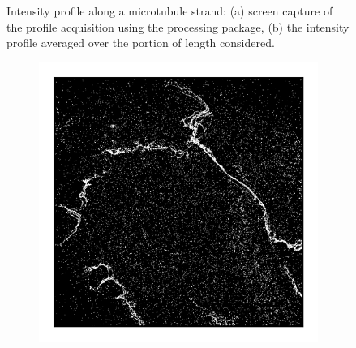 \begin{figure}[htbp]
\begin{subfigure}[b]{0.49\textwidth}
        \caption{}
        \label{fig:microtubules_width_analysis}
    \end{subfigure}
    \label{fig:microtubules_width}
    \caption{Intensity profile along a microtubule strand: (a) screen capture of the profile acquisition using the  processing package, (b) the intensity profile averaged over the portion of length considered.}
\end{figure}

\begin{figure}
    \begin{subfigure}{0.32\textwidth}
        \includegraphics[width=\textwidth]{figures/microtubules_image1.png}
        \caption{}
    \end{subfigure}
    \begin{subfigure}{0.32\textwidth}

\end{subfigure}
\end{figure}
